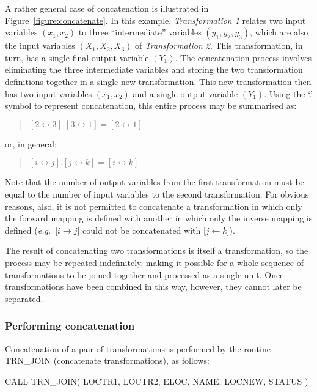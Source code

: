 \documentclass[twoside,nolof,11pt]{starlink}
\providecommand{\name}[1]{\small{#1}}
\begin{document}
A rather general case of concatenation is illustrated in
Figure~\ref{figure:concatenate}.
In this example, \emph{Transformation 1} relates two input variables
\mbox{$(x_1,x_2)$} to three ``intermediate'' variables
\mbox{$(y_1,y_2,y_3)$}, which are also the input variables
\mbox{$(X_1,X_2,X_3)$} of \emph{Transformation 2}.
This transformation, in turn, has a single final output variable
\mbox{$(Y_1)$}.
The concatenation process involves eliminating the three intermediate
variables and storing the two transformation definitions together in a
single new transformation.
This new transformation then has two input variables \mbox{$(x_1,x_2)$} and
a single output variable \mbox{$(Y_1)$}.
Using the `.' symbol to represent concatenation, this entire process may be
summarised as:
\begin{quote}
\begin{center}
$[2 \leftrightarrow 3].[3 \leftrightarrow 1] = [2 \leftrightarrow 1]$
\end{center}
\end{quote}
or, in general:
\begin{quote}
\begin{center}
$[i \leftrightarrow j].[j \leftrightarrow k] = [i \leftrightarrow k]$
\end{center}
\end{quote}
Note that the number of output variables from the first transformation must
be equal to the number of input variables to the second transformation.
For obvious reasons, also, it is not permitted to concatenate a
transformation in which only the forward mapping is defined with another in
which only the inverse mapping is defined (\emph{e.g.}\ \mbox{[$i \rightarrow
j$]} could not be concatenated with \mbox{[$j \leftarrow k$]}).

The result of concatenating two transformations is itself a transformation,
so the process may be repeated indefinitely, making it possible for a whole
sequence of transformations to be joined together and processed as a single
unit.
Once transformations have been combined in this way, however, they cannot
later be separated.

\subsubsection{Performing concatenation}
Concatenation of a pair of transformations is performed by the routine
\name{TRN\_JOIN} (concatenate transformations), as follows:

\begin{terminalv}
CALL TRN_JOIN( LOCTR1, LOCTR2, ELOC, NAME, LOCNEW, STATUS )
\end{terminalv}
\end{document}
